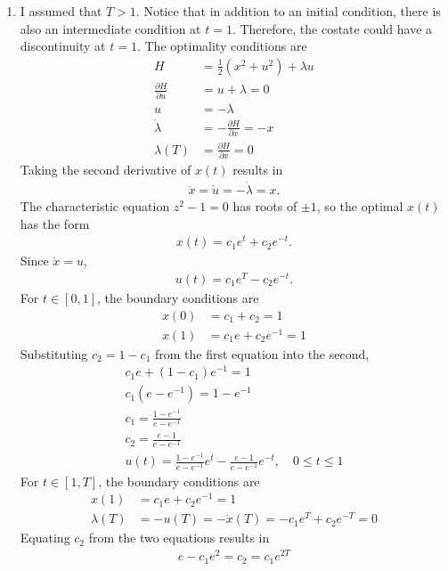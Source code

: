 \documentclass[letterpaper,11pt,titlepage]{article}
\newcommand*\pder[2]{\frac{\partial #1}{\partial #2}}
\begin{document}
\begin{enumerate}[leftmargin=0pt]
\item I assumed that $T>1$. Notice that in addition to an initial condition, there is also an intermediate condition at $t=1$. Therefore, the costate could have a discontinuity at $t=1$. The optimality conditions are
  \begin{align}
    H &= \frac12 (x^2 + u^2) + \lambda u \\
    \pder{H}{u} &= u + \lambda = 0 \\
    u &= -\lambda \\
    \dot\lambda &= -\pder{H}{x} = -x \\
    \lambda(T) &= \pder{H}{x} = 0
  \end{align}
  Taking the second derivative of $x(t)$ results in
  \begin{gather}
    \ddot x = \dot u = -\dot\lambda = x.
  \end{gather}
  The characteristic equation $z^2 - 1 = 0$ has roots of $\pm 1$, so the optimal $x(t)$ has the form
  \begin{gather}
    x(t) = c_1 e^t + c_2 e^{-t}.
  \end{gather}
  Since $\dot x = u$,
  \begin{gather}
    u(t) = c_1 e^T - c_2 e^{-t}.
  \end{gather}
  For $t\in[0,1]$, the boundary conditions are
  \begin{align}
    x(0) &= c_1 + c_2 = 1 \\
    x(1) &= c_1 e + c_2 e^{-1} = 1
  \end{align}
  Substituting $c_2=1-c_1$ from the first equation into the second,
  \begin{gather}
    c_1 e + (1-c_1)e^{-1} = 1 \\
    c_1 (e - e^{-1}) = 1 - e^{-1} \\
    c_1 = \frac{1-e^{-1}}{e - e^{-1}} \\
    c_2 = \frac{e - 1}{e - e^{-1}} \\
    u(t) = \frac{1-e^{-1}}{e - e^{-1}} e^t - \frac{e - 1}{e - e^{-1}} e^{-t}, \quad 0\le t\le 1
  \end{gather}
  For $t\in[1,T]$, the boundary conditions are
  \begin{align}
    x(1) &= c_1 e + c_2 e^{-1} = 1 \\
    \lambda(T) &= -u(T) = -\dot x(T) = -c_1 e^T + c_2 e^{-T} = 0
  \end{align}
  Equating $c_2$ from the two equations results in
  \begin{gather}
    e - c_1 e^2 = c_2 = c_1 e^{2T} \\

\end{gather}
\end{enumerate}
\end{document}
